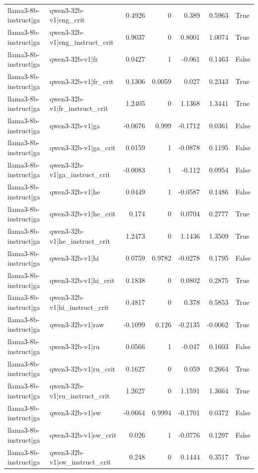 \begin{table}
\begin{tabular}{l l r r r r l}
llama3-8b-instruct|ga & qwen3-32b-v1|eng_crit & 0.4926 & 0 & 0.389 & 0.5963 & True \\
llama3-8b-instruct|ga & qwen3-32b-v1|eng_instruct_crit & 0.9037 & 0 & 0.8001 & 1.0074 & True \\
llama3-8b-instruct|ga & qwen3-32b-v1|fr & 0.0427 & 1 & -0.061 & 0.1463 & False \\
llama3-8b-instruct|ga & qwen3-32b-v1|fr_crit & 0.1306 & 0.0059 & 0.027 & 0.2343 & True \\
llama3-8b-instruct|ga & qwen3-32b-v1|fr_instruct_crit & 1.2405 & 0 & 1.1368 & 1.3441 & True \\
llama3-8b-instruct|ga & qwen3-32b-v1|ga & -0.0676 & 0.999 & -0.1712 & 0.0361 & False \\
llama3-8b-instruct|ga & qwen3-32b-v1|ga_crit & 0.0159 & 1 & -0.0878 & 0.1195 & False \\
llama3-8b-instruct|ga & qwen3-32b-v1|ga_instruct_crit & -0.0083 & 1 & -0.112 & 0.0954 & False \\
llama3-8b-instruct|ga & qwen3-32b-v1|he & 0.0449 & 1 & -0.0587 & 0.1486 & False \\
llama3-8b-instruct|ga & qwen3-32b-v1|he_crit & 0.174 & 0 & 0.0704 & 0.2777 & True \\
llama3-8b-instruct|ga & qwen3-32b-v1|he_instruct_crit & 1.2473 & 0 & 1.1436 & 1.3509 & True \\
llama3-8b-instruct|ga & qwen3-32b-v1|hi & 0.0759 & 0.9782 & -0.0278 & 0.1795 & False \\
llama3-8b-instruct|ga & qwen3-32b-v1|hi_crit & 0.1838 & 0 & 0.0802 & 0.2875 & True \\
llama3-8b-instruct|ga & qwen3-32b-v1|hi_instruct_crit & 0.4817 & 0 & 0.378 & 0.5853 & True \\
llama3-8b-instruct|ga & qwen3-32b-v1|raw & -0.1099 & 0.126 & -0.2135 & -0.0062 & True \\
llama3-8b-instruct|ga & qwen3-32b-v1|ru & 0.0566 & 1 & -0.047 & 0.1603 & False \\
llama3-8b-instruct|ga & qwen3-32b-v1|ru_crit & 0.1627 & 0 & 0.059 & 0.2664 & True \\
llama3-8b-instruct|ga & qwen3-32b-v1|ru_instruct_crit & 1.2627 & 0 & 1.1591 & 1.3664 & True \\
llama3-8b-instruct|ga & qwen3-32b-v1|sw & -0.0664 & 0.9994 & -0.1701 & 0.0372 & False \\
llama3-8b-instruct|ga & qwen3-32b-v1|sw_crit & 0.026 & 1 & -0.0776 & 0.1297 & False \\
llama3-8b-instruct|ga & qwen3-32b-v1|sw_instruct_crit & 0.248 & 0 & 0.1444 & 0.3517 & True \\

\end{tabular}
\end{table}
